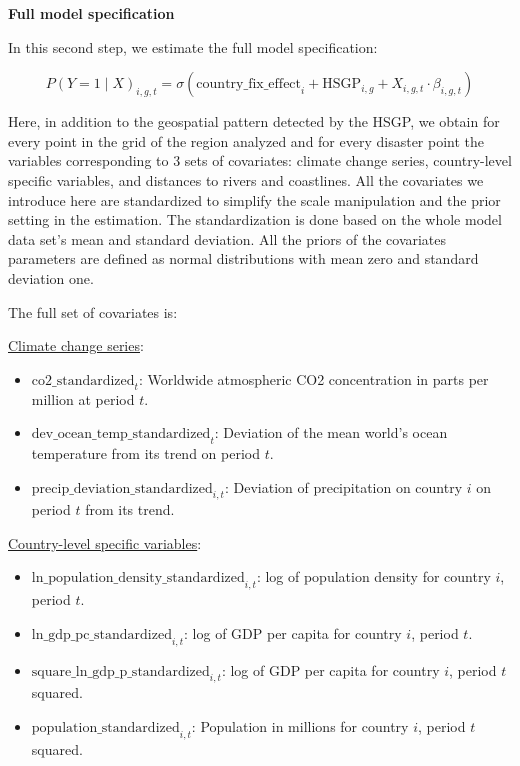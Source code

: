 \textbf{Full model specification}

In this second step, we estimate the full model specification:

\begin{equation}
P(Y=1 \mid X)_{i,g,t} = \sigma\left( \text{country\_fix\_effect}_i + \text{HSGP}_{i,g} + X_{i,g,t} \cdot \beta_{i,g,t} \right)
\end{equation}

Here, in addition to the geospatial pattern detected by the HSGP, we obtain for every point in the grid of the region analyzed and for every disaster point the variables corresponding to 3 sets of covariates: climate change series, country-level specific variables, and distances to rivers and coastlines. All the covariates we introduce here are standardized to simplify the scale manipulation and the prior setting in the estimation. The standardization is done based on the whole model data set's mean and standard deviation. All the priors of the covariates parameters are defined as normal distributions with mean zero and standard deviation one.

The full set of covariates is:

\underline{Climate change series}:
\begin{itemize}
    \item $\text{co2\_standardized}_{t}$: Worldwide atmospheric CO2 concentration in parts per million at period $t$.
    \item $\text{dev\_ocean\_temp\_standardized}_t$: Deviation of the mean world's ocean temperature from its trend on period $t$.
    \item $\text{precip\_deviation\_standardized}_{i,t}$: Deviation of precipitation on country $i$ on period $t$ from its trend.
\end{itemize}

\underline{Country-level specific variables}:
\begin{itemize}
    \item $\text{ln\_population\_density\_standardized}_{i,t}$: log of population density for country $i$, period $t$.
    \item $\text{ln\_gdp\_pc\_standardized}_{i,t}$: log of GDP per capita for country $i$, period $t$.
    \item $\text{square\_ln\_gdp\_p\_standardized}_{i,t}$: log of GDP per capita for country $i$, period $t$ squared.
    \item $\text{population\_standardized}_{i,t}$: Population in millions for country $i$, period $t$ squared.
\end{itemize}


